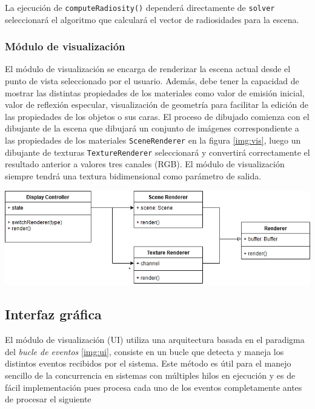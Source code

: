 La ejecución de \verb|computeRadiosity()| dependerá directamente de \verb|solver| seleccionará el algoritmo que calculará el vector de radiosidades para la escena.

\subsubsection{Módulo de visualización}

El módulo de visualización se encarga de renderizar la escena actual desde el punto de vista seleccionado por el usuario. Además, debe tener la capacidad de mostrar las distintas propiedades de los materiales como valor de emisión inicial, valor de reflexión especular, visualización de geometría para facilitar la edición de las propiedades de los objetos o sus caras. El proceso de dibujado comienza con el dibujante de la escena que dibujará un conjunto de imágenes correspondiente a las propiedades de los materiales \verb|SceneRenderer| en la figura \ref{img:vis}, luego un dibujante de texturas \verb|TextureRenderer| seleccionará y convertirá correctamente el resultado anterior a valores tres canales (RGB). El módulo de visualización siempre tendrá una textura bidimensional como parámetro de salida.

\vspace{5mm}
\begin{minipage}[h]{0.8\linewidth}
	\centering
	\includegraphics[width=\linewidth]{assets/display}
	\label{img:vis}
\end{minipage}

\subsection{Interfaz gráfica}

El módulo de visualización (UI) utiliza una arquitectura basada en el paradigma del \textit{bucle de eventos} \ref{img:ui}, consiste en un bucle que detecta y maneja los distintos eventos recibidos por el sistema. Este método es útil para el manejo sencillo de la concurrencia en sistemas con múltiples hilos en ejecución y es de fácil implementación pues procesa cada uno de los eventos completamente antes de procesar el siguiente


